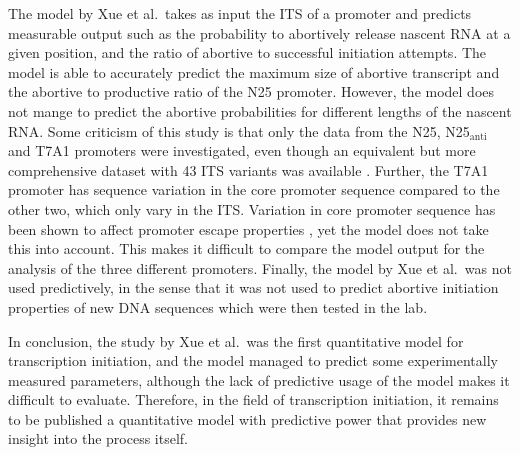 The model by Xue et al.\ takes as input the ITS of a promoter and predicts
measurable output such as the probability to abortively release nascent RNA at
a given position, and the ratio of abortive to successful initiation attempts.
The model is able to accurately predict the maximum size of abortive transcript
and the abortive to productive ratio of the N25 promoter. However, the model
does not mange to predict the abortive probabilities for different lengths of
the nascent RNA. Some criticism of this study is that only the data from the
N25, N25$_{\text{anti}}$ and T7A1 promoters were investigated, even though an
equivalent but more comprehensive dataset with 43 ITS variants was available
\cite{hsu_initial_2006}. Further, the T7A1 promoter has sequence variation in
the core promoter sequence compared to the other two, which only vary in the
ITS.  Variation in core promoter sequence has been shown to affect promoter
escape properties \cite{vo_vitro_2003}, yet the model does not take this
into account. This makes it difficult to compare the model output for the
analysis of the three different promoters. Finally, the model by Xue et al.\
was not used predictively, in the sense that it was not used to predict
abortive initiation properties of new DNA sequences which were then tested in
the lab.

In conclusion, the study by Xue et al.\ was the first quantitative model for
transcription initiation, and the model managed to predict some experimentally
measured parameters, although the lack of predictive usage of the model makes
it difficult to evaluate. Therefore, in the field of transcription initiation,
it remains to be published a quantitative model with predictive power that
provides new insight into the process itself.
